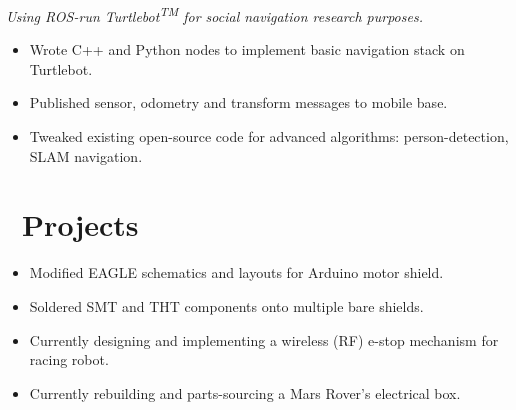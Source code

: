 \documentclass{resume}
\begin{document}
\textit{Using ROS-run Turtlebot\textsuperscript{TM} for social navigation research purposes.}
\begin{itemize}
  \item Wrote C++ and Python nodes to implement basic navigation stack on Turtlebot. 
  \item Published sensor, odometry and transform messages to mobile base.
  \item Tweaked existing open-source code for advanced algorithms: person-detection, SLAM navigation.
\end{itemize}

\begin{comment}
\datedsubsection{\textbf{Mechanical Design Co-op}}{Sep -- Dec 2014}
\company{\textbf{Prodomax Automation Inc.}}{Barrie, ON}
\textit{Designing jigs and fixtures in Solidworks for automotive part-assembly stations.}
\begin{itemize}
  \item Modeled custom tooling in two stations for assembling a vehicle's seat track mechanism. One inserted an anti-collapse spacer and the other stamp-pressed a bushing.
  \item Detailed and ballooned numerous part and assembly drawings extensively.
\end{itemize}
\end{comment}

\section{\faFlask\ Projects}

\begin{itemize}
  \item Modified EAGLE schematics and layouts for Arduino motor shield. 
  \item Soldered SMT and THT components onto multiple bare shields.
  \item Currently designing and implementing a wireless (RF) e-stop mechanism for racing robot.
  \item Currently rebuilding and parts-sourcing a Mars Rover's electrical box. 
\end{itemize}
\end{document}
